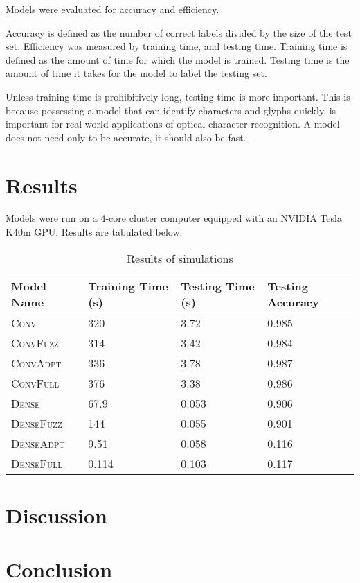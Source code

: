 \documentclass{article}
\begin{document}
Models were evaluated for accuracy and efficiency.

Accuracy is defined as the number of correct labels divided by the size of the test set.
Efficiency was measured by training time, and testing time.
Training time is defined as the amount of time for which the model is trained.
Testing time is the amount of time it takes for the model to label the testing set.

Unless training time is prohibitively long, testing time is more important.
This is because possessing a model that can identify characters and glyphs quickly,
is important for real-world applications of optical character recognition.
A model does not need only to be accurate, it should also be fast.

\section{Results}

Models were run on a 4-core cluster computer equipped with an NVIDIA Tesla K40m GPU.
Results are tabulated below:

\begin{table}
  \caption{Results of simulations}
  \label{tbl:results}
  \centering
  \begin{tabular}{llll}
    \toprule
    Model Name & Training Time (s) & Testing Time (s) & Testing Accuracy \\
    \midrule
    \textsc{Conv}         & 320 & 3.72 & 0.985 \\
    \textsc{ConvFuzz}     & 314 & 3.42 & 0.984 \\
    \textsc{ConvAdpt}     & 336 & 3.78 & 0.987 \\
    \textsc{ConvFull}     & 376 & 3.38 & 0.986 \\
    \textsc{Dense}        & 67.9 & 0.053 & 0.906 \\
    \textsc{DenseFuzz}    & 144 & 0.055 & 0.901 \\
    \textsc{DenseAdpt}    & 9.51 & 0.058 & 0.116 \\
    \textsc{DenseFull}    & 0.114 & 0.103 & 0.117 \\
    \bottomrule
  \end{tabular}
\end{table}

\section{Discussion}

\section{Conclusion}


\end{document}
